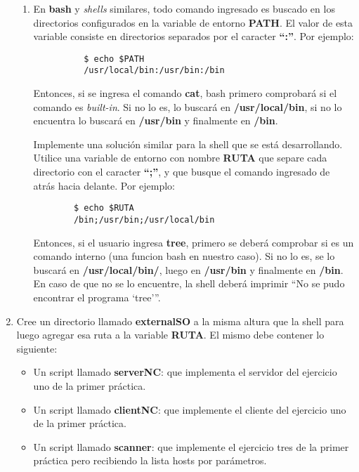 \begin{enumerate}
\begin{enumerate}
	    \item En \textbf{bash} y \textit{shells} similares, todo comando ingresado es buscado en los directorios configurados en la variable de entorno \textbf{PATH}. El valor de esta variable consiste en directorios separados por el caracter \textbf{``:''}. Por ejemplo:
	    \begin{lstlisting}
		  $ echo $PATH
		  /usr/local/bin:/usr/bin:/bin
	    \end{lstlisting}
	    
	    Entonces, si se ingresa el comando \textbf{cat}, bash primero comprobará si el comando es \textit{built-in}. Si no lo es, lo buscará en \textbf{/usr/local/bin}, si no lo encuentra lo buscará en \textbf{/usr/bin} y finalmente en \textbf{/bin}.
	    
	    
	    Implemente una solución similar para la shell que se está desarrollando. Utilice una variable de entorno con nombre \textbf{RUTA} que separe cada directorio con el caracter \textbf{``;''}, y que busque el comando ingresado de atrás hacia delante. Por ejemplo:
	    \begin{lstlisting}
		$ echo $RUTA
		/bin;/usr/bin;/usr/local/bin
	    \end{lstlisting}
	    Entonces, si el usuario ingresa \textbf{tree}, primero se deberá comprobar si es un comando interno (una funcion bash en nuestro caso). Si no lo es, se lo buscará en \textbf{/usr/local/bin/}, luego en \textbf{/usr/bin} y finalmente en \textbf{/bin}. En caso de que no se lo encuentre, la shell deberá imprimir ``No se pudo encontrar el programa `tree'''.
      \end{enumerate}

      \item Cree un directorio llamado \textbf{externalSO} a la misma altura que la shell para luego agregar esa ruta a la variable \textbf{RUTA}. El mismo debe contener lo siguiente: \label{puntoComandosExternos}
      \begin{itemize}
      	\item Un script llamado \textbf{serverNC}: que implementa el servidor del ejercicio uno de la primer práctica. 
      	\item Un script llamado \textbf{clientNC}: que implemente el cliente del ejercicio uno de la primer práctica.
      	\item Un script llamado \textbf{scanner}: que implemente el ejercicio tres de la primer práctica pero recibiendo la lista hosts por parámetros.
      \end{itemize}
      

\end{enumerate}
